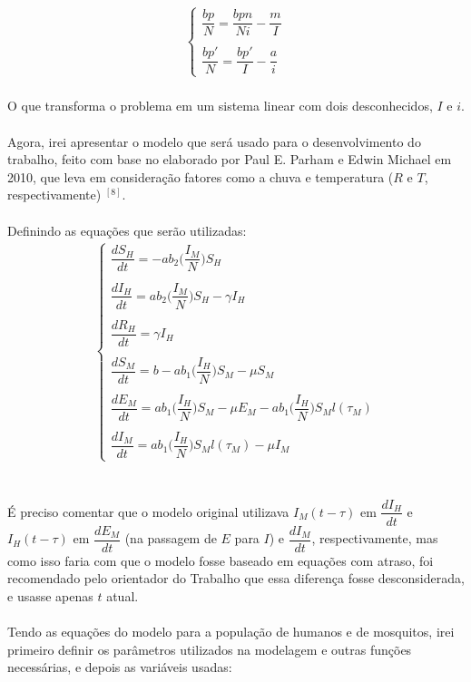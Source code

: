 \documentclass[12pt]{article}
\begin{document}
\begin{gather*}
\begin{cases}
\dfrac{bp}{N} = \dfrac{bpn}{Ni} -\dfrac{m}{I} \\
\\
\dfrac{bp'}{N} = \dfrac{bp'}{I} -\dfrac{a}{i} 
\end{cases}
\end{gather*}
\\
O que transforma o problema em um sistema linear com dois desconhecidos, $I$ e $i$.
\\\\
Agora, irei apresentar o modelo que será usado para o desenvolvimento do trabalho, feito com base no elaborado por Paul E. Parham e Edwin Michael em 2010, que leva em consideração fatores como a chuva e temperatura ($R$ e $T$, respectivamente) $^{[8]}$. 
\\\\
Definindo as equações que serão utilizadas:
\begin{gather*}
\begin{cases}
\dfrac{dS_H}{dt} = -ab_2\bigg(\dfrac{I_M}{N}\bigg)S_H\\
\\
\dfrac{dI_H}{dt} = ab_2\bigg(\dfrac{I_M}{N}\bigg)S_H-\gamma I_H\\
\\
\dfrac{dR_H}{dt} = \gamma I_H\\
\\
\dfrac{dS_M}{dt} = b - ab_1\bigg(\dfrac{I_H}{N}\bigg)S_M - \mu S_M\\
\\
\dfrac{dE_M}{dt} = ab_1\bigg(\dfrac{I_H}{N}\bigg)S_M - \mu E_M - ab_1\bigg(\dfrac{I_H}{N}\bigg)S_Ml(\tau_M)\\
\\
\dfrac{dI_M}{dt} = ab_1\bigg(\dfrac{I_H}{N}\bigg)S_Ml(\tau_M) -\mu I_M
\end{cases}
\end{gather*}
\\\\
É preciso comentar que o modelo original utilizava $I_M(t-\tau)$ em $\dfrac{dI_H}{dt}$ e $I_H(t-\tau)$ em $\dfrac{dE_M}{dt}$ (na passagem de $E$ para $I$) e $\dfrac{dI_M}{dt}$, respectivamente, mas como isso faria com que o modelo fosse baseado em equações com atraso, foi recomendado pelo orientador do Trabalho que essa diferença fosse desconsiderada, e usasse apenas $t$ atual.
\\\\
Tendo as equações do modelo para a população de humanos e de mosquitos, irei primeiro definir os parâmetros utilizados na modelagem e outras funções necessárias, e depois as variáveis usadas:
\end{document}
